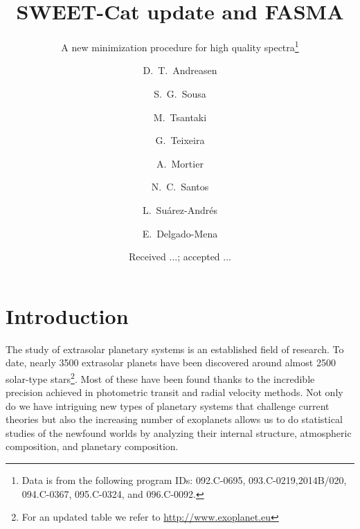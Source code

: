 \documentclass{aa}
\begin{document}
\title{SWEET-Cat update and FASMA}
\subtitle{A new minimization procedure for high quality spectra\thanks{Data is
from the following program IDs: 092.C-0695, 093.C-0219,2014B/020, 094.C-0367,
095.C-0324, and 096.C-0092.}}


\author{ D.~T.~Andreasen
    \and S.~G.~Sousa
    \and M.~Tsantaki
    \and G.~Teixeira
    \and A.~Mortier
    \and N.~C.~Santos
    \and L.~Su\'arez-Andr\'es
    \and E.~Delgado-Mena
}







\date{Received ...; accepted ...}

\abstract
{}
{}
{}
{}
{}



\maketitle



\section{Introduction}
\label{sec:introduction}
The study of extrasolar planetary systems is an established field of research.
To date, nearly 3500 extrasolar planets have been discovered around almost 2500
solar-type stars\footnote{For an updated table we refer to
\url{http://www.exoplanet.eu}}. Most of these have been found thanks to the
incredible precision achieved in photometric transit and radial velocity
methods. Not only do we have intriguing new types of planetary systems that
challenge current theories but also the increasing number of exoplanets allows
us to do statistical studies of the newfound worlds by analyzing their internal
structure, atmospheric composition, and planetary composition.
\end{document}
